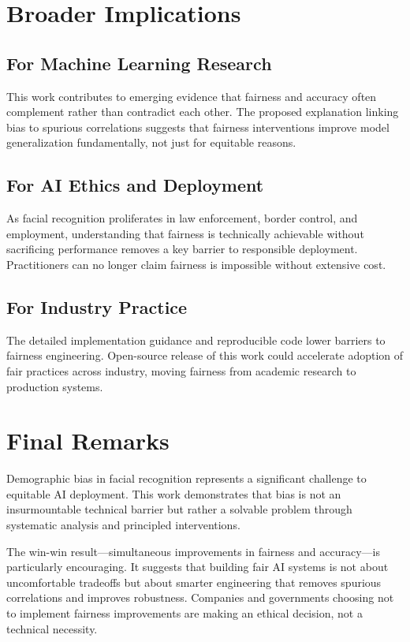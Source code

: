 \documentclass[11pt,a4paper,oneside]{report}
\begin{document}
\section{Broader Implications}

\subsection{For Machine Learning Research}

This work contributes to emerging evidence that fairness and accuracy often complement rather than contradict each other. The proposed explanation linking bias to spurious correlations suggests that fairness interventions improve model generalization fundamentally, not just for equitable reasons.

\subsection{For AI Ethics and Deployment}

As facial recognition proliferates in law enforcement, border control, and employment, understanding that fairness is technically achievable without sacrificing performance removes a key barrier to responsible deployment. Practitioners can no longer claim fairness is impossible without extensive cost.

\subsection{For Industry Practice}

The detailed implementation guidance and reproducible code lower barriers to fairness engineering. Open-source release of this work could accelerate adoption of fair practices across industry, moving fairness from academic research to production systems.

\section{Final Remarks}

Demographic bias in facial recognition represents a significant challenge to equitable AI deployment. This work demonstrates that bias is not an insurmountable technical barrier but rather a solvable problem through systematic analysis and principled interventions.

The win-win result---simultaneous improvements in fairness and accuracy---is particularly encouraging. It suggests that building fair AI systems is not about uncomfortable tradeoffs but about smarter engineering that removes spurious correlations and improves robustness. Companies and governments choosing not to implement fairness improvements are making an ethical decision, not a technical necessity.
\end{document}
